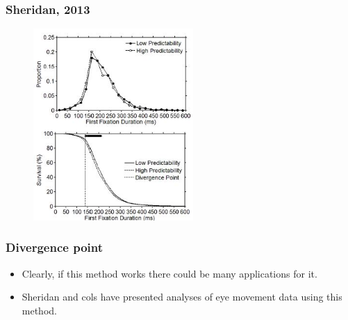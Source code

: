 \documentclass{beamer}
\begin{document}
{  	\frame
  	{
     		\frametitle{Sheridan, 2013}
		\begin{figure}[htbp] %
    			\centering
    			\includegraphics[width=2.4in]{heather1.jpg} 
    			\label{fig:dvff}
 		\end{figure}		
	}

	\frame
	{
		\frametitle{Divergence point}
		\begin{itemize}
			\item Clearly, if this method works there could be many applications for it.
			\item Sheridan and cols have presented analyses of eye movement data using this method.
		\end{itemize}
	}
	
}
\end{document}
